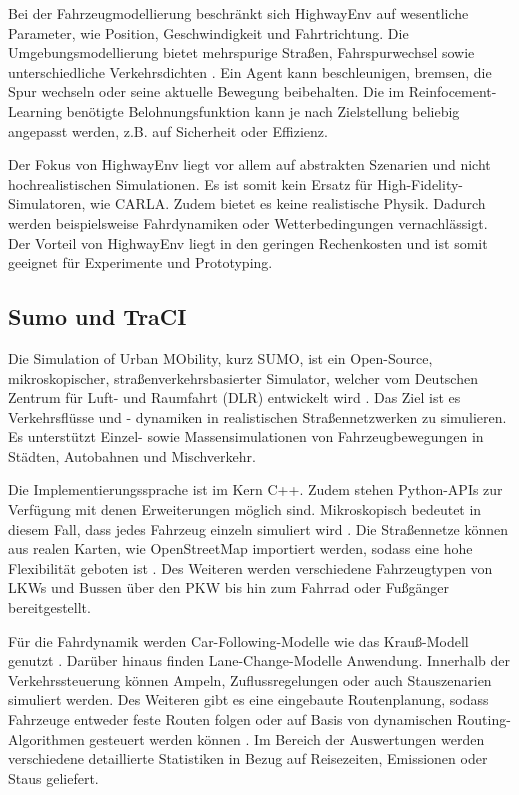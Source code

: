 Bei der Fahrzeugmodellierung beschränkt sich HighwayEnv auf wesentliche Parameter, wie Position, Geschwindigkeit und Fahrtrichtung. Die Umgebungsmodellierung bietet mehrspurige Straßen, Fahrspurwechsel sowie unterschiedliche Verkehrsdichten \cite{highway-env}. Ein Agent kann beschleunigen, bremsen, die Spur wechseln oder seine aktuelle Bewegung beibehalten. Die im Reinfocement-Learning benötigte Belohnungsfunktion kann je nach Zielstellung beliebig angepasst werden, z.B. auf Sicherheit oder Effizienz. 

Der Fokus von HighwayEnv liegt vor allem auf abstrakten Szenarien und nicht hochrealistischen Simulationen. Es ist somit kein Ersatz für High-Fidelity-Simulatoren, wie CARLA. Zudem bietet es keine realistische Physik. Dadurch werden beispielsweise Fahrdynamiken oder Wetterbedingungen vernachlässigt. Der Vorteil von HighwayEnv liegt in den geringen Rechenkosten und ist somit geeignet für Experimente und Prototyping.
\subsection{Sumo und TraCI}
Die Simulation of Urban MObility, kurz SUMO, ist ein Open-Source, mikroskopischer, straßenverkehrsbasierter Simulator, welcher vom Deutschen Zentrum für Luft- und Raumfahrt (DLR) entwickelt wird \cite{SUMO2018}. Das Ziel ist es Verkehrsflüsse und - dynamiken in realistischen Straßennetzwerken zu simulieren. Es unterstützt Einzel- sowie Massensimulationen von Fahrzeugbewegungen in Städten, Autobahnen und Mischverkehr.

Die Implementierungssprache ist im Kern C++. Zudem stehen Python-APIs zur Verfügung mit denen Erweiterungen möglich sind. Mikroskopisch bedeutet in diesem Fall, dass jedes Fahrzeug einzeln simuliert wird \cite{sumo_at_a_glance}. Die Straßennetze können aus realen Karten, wie OpenStreetMap importiert werden, sodass eine hohe Flexibilität geboten ist \cite{sumo_open_street_map}. Des Weiteren werden verschiedene Fahrzeugtypen von LKWs und Bussen über den PKW bis hin zum Fahrrad oder Fußgänger bereitgestellt.

Für die Fahrdynamik werden Car-Following-Modelle wie das Krauß-Modell genutzt \cite{sumo_car_following}. Darüber hinaus finden Lane-Change-Modelle Anwendung. Innerhalb der Verkehrssteuerung können Ampeln, Zuflussregelungen oder auch Stauszenarien simuliert werden. Des Weiteren gibt es eine eingebaute Routenplanung, sodass Fahrzeuge entweder feste Routen folgen oder auf Basis von dynamischen Routing-Algorithmen gesteuert werden können \cite{sumo_vehicles}. Im Bereich der Auswertungen werden verschiedene detaillierte Statistiken in Bezug auf Reisezeiten, Emissionen oder Staus geliefert.

